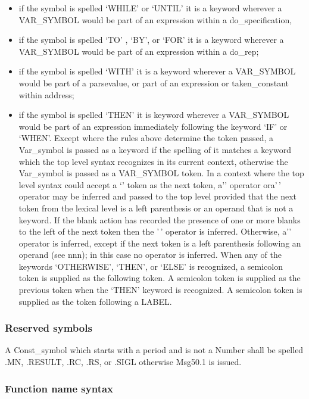 \begin{itemize}
\item
  if the symbol is spelled `WHILE' or `UNTIL' it is a keyword wherever a
  VAR\_SYMBOL would be part of an expression within a do\_specification,
\item
  if the symbol is spelled `TO' , `BY', or `FOR' it is a keyword
  wherever a VAR\_SYMBOL would be part of an expression within a
  do\_rep;
\item
  if the symbol is spelled `WITH' it is a keyword wherever a VAR\_SYMBOL
  would be part of a parsevalue, or part of an expression or
  taken\_constant within address;
\item
  if the symbol is spelled `THEN' it is keyword wherever a VAR\_SYMBOL
  would be part of an expression immediately following the keyword `IF'
  or `WHEN'. Except where the rules above determine the token passed, a
  Var\_symbol is passed as a keyword if the spelling of it matches a
  keyword which the top level syntax recognizes in its current context,
  otherwise the Var\_symbol is passed as a VAR\_SYMBOL token. In a
  context where the top level syntax could accept a `\textbar\textbar{}'
  token as the next token, a'\textbar\textbar' operator ora'\,' operator
  may be inferred and passed to the top level provided that the next
  token from the lexical level is a left parenthesis or an operand that
  is not a keyword. If the blank action has recorded the presence of one
  or more blanks to the left of the next token then the '\,' operator is
  inferred. Otherwise, a'\textbar\textbar' operator is inferred, except
  if the next token is a left parenthesis following an operand (see
  nnn); in this case no operator is inferred. When any of the keywords
  `OTHERWISE', `THEN', or `ELSE' is recognized, a semicolon token is
  supplied as the following token. A semicolon token is supplied as the
  previous token when the `THEN' keyword is recognized. A semicolon
  token is supplied as the token following a LABEL.
\end{itemize}

\hypertarget{reserved-symbols}{%
\subsubsection{Reserved symbols}\label{reserved-symbols}}

A Const\_symbol which starts with a period and is not a Number shall be
spelled .MN, .RESULT, .RC, .RS, or .SIGL otherwise Msg50.1 is issued.

\hypertarget{function-name-syntax}{%
\subsubsection{Function name syntax}\label{function-name-syntax}}

